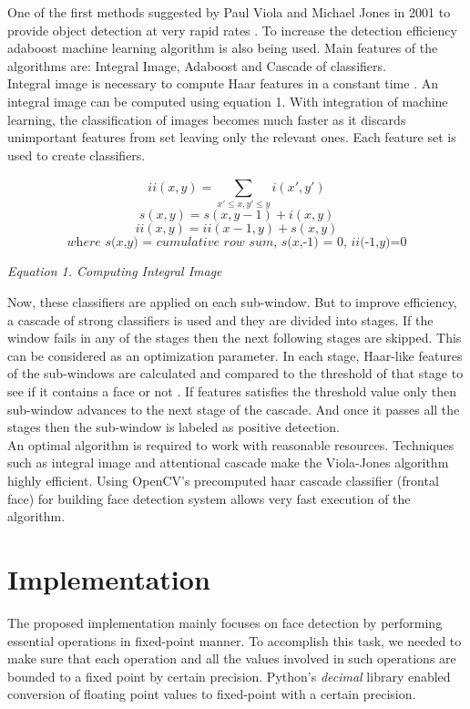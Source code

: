 \documentclass[12pt]{elsarticle}
\begin{document}
One of the first methods suggested by Paul Viola and Michael Jones in 2001 to provide object detection at very rapid rates \cite{Three}. To increase the detection efficiency adaboost machine learning algorithm is also being used. Main features of the algorithms are: Integral Image, Adaboost and Cascade of classifiers. \\

Integral image is necessary to compute Haar features in a constant time \cite{One}. An integral image can be computed using equation 1. With integration of machine learning, the classification of images becomes much faster as it discards unimportant features from set leaving only the relevant ones. Each feature set is used to create classifiers. 

\[ii(x,y) = {\sum_{x'\leq x,y'\leq y}^{}i(x',y')}\] 
\[s(x,y) = s(x,y-1)+i(x,y)\] 
\[ii(x,y) = ii(x-1,y)+s(x,y)\] 
\[\textit{where s(x,y) = cumulative row sum, s(x,-1) = 0, ii(-1,y)=0} \]
\begin{center}
\textit{Equation 1. Computing Integral Image \cite{Three}} 
\end{center}

Now, these classifiers are applied on each sub-window. But to improve efficiency, a cascade of strong classifiers is used and they are divided into stages. If the window fails in any of the stages then the next following stages are skipped. This can be considered as an optimization parameter. In each stage, Haar-like features of the sub-windows are calculated and compared to the threshold of that stage to see if it contains a face or not \cite{One}. If features satisfies the threshold value only then sub-window advances to the next stage of the cascade. And once it passes all the stages then the sub-window is labeled as positive detection.\\

An optimal algorithm is required to work with reasonable resources. Techniques such as integral image and attentional cascade make the Viola-Jones algorithm \cite{Three} highly efficient. Using OpenCV's precomputed haar cascade classifier (frontal face) for building face detection system allows very fast execution of the algorithm.

\section{Implementation}
\label{S:2}

The proposed implementation mainly focuses on face detection by performing essential operations in fixed-point manner. To accomplish this task, we needed to make sure that each operation and all the values involved in such operations are bounded to a fixed point by certain precision. Python's \textit{decimal} library enabled conversion of floating point values to fixed-point with a certain precision.\\
\end{document}
